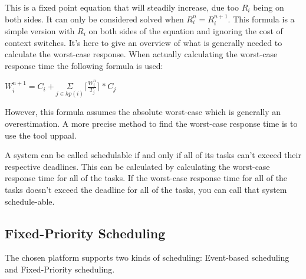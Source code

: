 This is a fixed point equation that will steadily increase, due too $R_{i}$ being on both sides. It can only be considered solved when $ R_{i}^n = R_{i}^{n+1}$. This formula is a simple version with $R_{i}$ on both sides of the equation and ignoring the cost of context switches. It's here to give an overview of what is generally needed to calculate the worst-case response.  When actually calculating the worst-case response time the following formula is used:

$W_{i}^{n+1} =  C_{i} + \underset{j\in hp(i)}{\Sigma} \lceil\frac{W_{i}^n}{T_{j}}\rceil*C_{j} $

However, this formula assumes the absolute worst-case which is generally an overestimation. A more precise method to find the worst-case response time is to use the tool uppaal.

A system can be called schedulable if and only if all of its tasks can't exceed their respective deadlines. This can be calculated by calculating the worst-case response time for all of the tasks. If the worst-case response time for all of the tasks doesn't exceed the deadline for all of the tasks, you can call that system schedule-able.\cite{roadRules}










\subsection{Fixed-Priority Scheduling}\label{prioratySch}
The chosen platform supports two kinds of scheduling: Event-based scheduling and Fixed-Priority scheduling\cite{OILManual}. 

